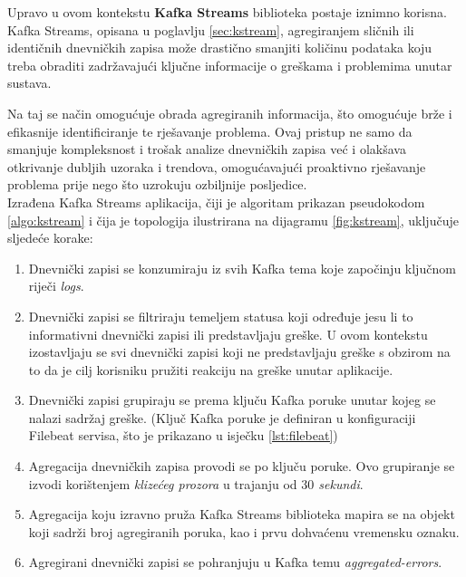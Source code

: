 \documentclass[times, utf8, diplomski]{fer}
\begin{document}
Upravo u ovom kontekstu \textbf{Kafka Streams} biblioteka postaje iznimno korisna. Kafka Streams, opisana u poglavlju \ref{sec:kstream}, agregiranjem sličnih ili identičnih dnevničkih zapisa može drastično smanjiti količinu podataka koju treba obraditi zadržavajući ključne informacije o greškama i problemima unutar sustava.

Na taj se način omogućuje obrada agregiranih informacija, što omogućuje brže i efikasnije identificiranje te rješavanje problema. Ovaj pristup ne samo da smanjuje kompleksnost i trošak analize dnevničkih zapisa već i olakšava otkrivanje dubljih uzoraka i trendova, omogućavajući proaktivno rješavanje problema prije nego što uzrokuju ozbiljnije posljedice.\\

Izrađena Kafka Streams aplikacija, čiji je algoritam prikazan pseudokodom \ref{algo:kstream} i čija je topologija ilustrirana na dijagramu \ref{fig:kstream}, uključuje sljedeće korake:

\begin{enumerate}
	\item Dnevnički zapisi se konzumiraju iz svih Kafka tema koje započinju ključnom riječi \emph{\glqq logs\grqq}.
	\item Dnevnički zapisi se filtriraju temeljem statusa koji određuje jesu li to informativni dnevnički zapisi ili predstavljaju greške. U ovom kontekstu izostavljaju se svi dnevnički zapisi koji ne predstavljaju greške s obzirom na to da je cilj korisniku pružiti reakciju na greške unutar aplikacije.
	\item Dnevnički zapisi grupiraju se prema ključu Kafka poruke unutar kojeg se nalazi sadržaj greške. (Ključ Kafka poruke je definiran u konfiguraciji Filebeat servisa, što je prikazano u isječku \ref{lst:filebeat})
	\item Agregacija dnevničkih zapisa provodi se po ključu poruke. Ovo grupiranje se izvodi korištenjem \emph{klizećeg prozora} u trajanju od \emph{$30$ sekundi}.
	\item Agregacija koju izravno pruža Kafka Streams biblioteka mapira se na objekt koji sadrži broj agregiranih poruka, kao i prvu dohvaćenu vremensku oznaku.
	\item Agregirani dnevnički zapisi se pohranjuju u Kafka temu \emph{\glqq aggregated-errors\grqq}.
\end{enumerate}
\end{document}
